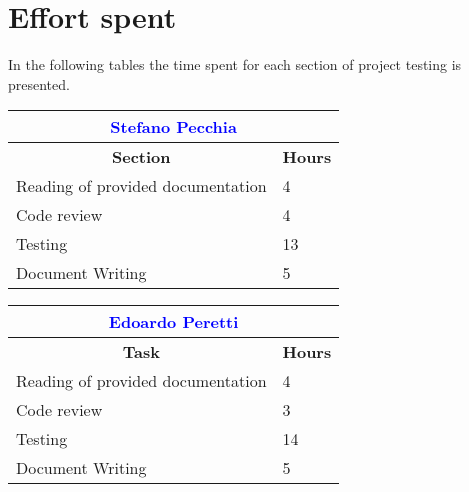 \section{Effort spent}
In the following tables the time spent for each section of project testing is presented.

\renewcommand\arraystretch{1.5}
\begin{table}[ht]
\centering
\begin{tabular}{|l|l|}
\multicolumn{2}{c}{\textcolor{Blue}{\textbf{Stefano Pecchia}}} \\\hline
\multicolumn{1}{|c|}{\textbf{Section}} & \multicolumn{1}{|c|}{\textbf{Hours}} \\\hline
    Reading of provided documentation & 4
    \\ \hline
    Code review & 4
    \\ \hline
    Testing & 13
      \\ \hline 
    Document Writing & 5
		\\ \hline

	\end{tabular}
	
	 \vspace{2.5em}
	\begin{tabular}{|l|l|}
\multicolumn{2}{c}{\textcolor{Blue}{\textbf{Edoardo Peretti}}} \\\hline
\multicolumn{1}{|c|}{\textbf{Task}} & \multicolumn{1}{|c|}{\textbf{Hours}} \\\hline
    Reading of provided documentation & 4
    \\ \hline
    Code review & 3
    \\ \hline
    Testing & 14
      \\ \hline 
    Document Writing & 5
		\\ \hline
\end{tabular}
\end{table}